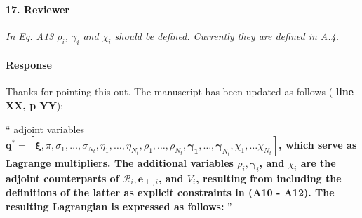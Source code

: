 \documentclass[]{article}
\newcommand{\red}[1]{\textbf{\color{red} #1}}
\newcommand{\revision}[1]{\textbf{#1}}
\newcommand{\bs}[1]{\boldsymbol{#1}}
\newcommand{\R}{\mathscr{R}}
\newcommand{\eperpi}{\bs{e}_{\perp,i}}
\begin{document}
\hrulefill

\paragraph{17. Reviewer} \textit{In Eq. A13 $\rho_i$, $\gamma_i$ and $\chi_i$ should be defined. Currently they are defined in A.4.}

\paragraph{Response} Thanks for pointing this out. The manuscript has been updated as follows (\red{line XX, p YY}):

``
adjoint variables \revision{$\bs{q}^* = [\bs{\xi}, \pi, \sigma_1, \dots, \sigma_{N_t}, \eta_1, \dots, \eta_{N_t}, \rho_1, \dots, \rho_{N_t}, \bs{\gamma_1}, \dots, \bs{\gamma}_{N_t}, \chi_1, \dots \chi_{N_t}]$, which serve as Lagrange multipliers. The additional variables $\rho_i, \bs{\gamma}_i$, and $\chi_i$ are the adjoint counterparts of $\R_i, \eperpi$, and $V_i$, resulting from including the definitions of the latter as explicit constraints in (A10 - A12). The resulting Lagrangian is expressed as follows:}
''

\hrulefill
\end{document}
